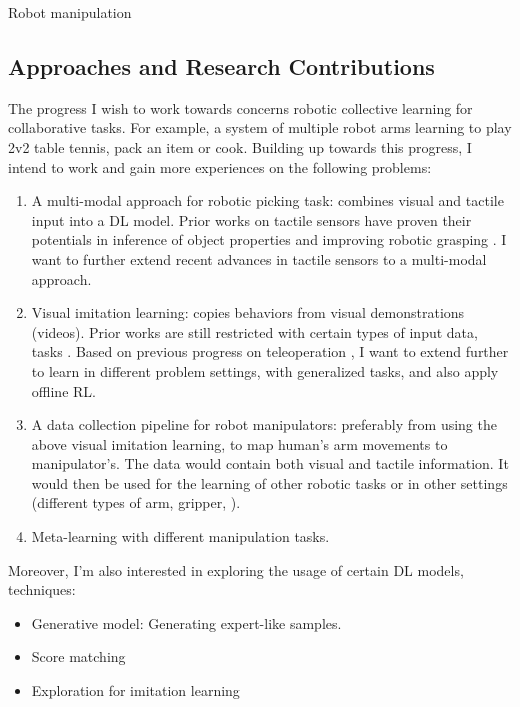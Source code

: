 Robot manipulation \cite{billard2019trends}

\subsection{Approaches and Research Contributions}
The progress I wish to work towards concerns robotic collective learning for collaborative tasks. For example, a system of multiple robot arms learning to play 2v2 table tennis, pack an item or cook. Building up towards this progress, I intend to work and gain more experiences on the following problems:

\begin{enumerate}
	\item A multi-modal approach for robotic picking task: combines visual and tactile input into a \ac{DL} model. Prior works on tactile sensors have proven their potentials in inference of object properties \cite{luo2017robotic} and improving robotic grasping \cite{yamaguchi2019recent}. I want to further extend recent advances in tactile sensors to a multi-modal approach.
	\item Visual imitation learning: copies behaviors from visual demonstrations (videos). Prior works are still restricted with certain types of input data, tasks \cite{finn2017one, sharma2019third}. 	Based on previous progress on teleoperation \cite{handa2020dexpilot}, I want to extend further to learn in different problem settings, with generalized tasks, and also apply offline \ac{RL}.
	\item A data collection pipeline for robot manipulators: preferably from using the above visual imitation learning, to map human’s arm movements to manipulator's. The data would contain both visual and tactile information. It would then be used for the learning of other robotic tasks or in other settings (different types of arm, gripper, \etc).
	\item Meta-learning with different manipulation tasks.
\end{enumerate}

Moreover, I'm also interested in exploring the usage of certain \ac{DL} models, techniques:
\begin{itemize}
	\item Generative model: Generating expert-like samples.
	\item Score matching
	\item Exploration for imitation learning
\end{itemize}

